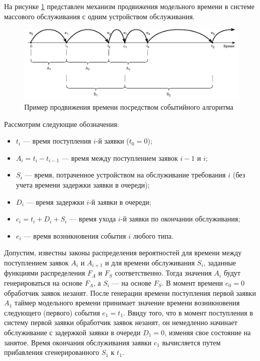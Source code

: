 На рисунке \ref{img:delta_z_example} представлен механизм продвижения модельного времени в системе массового обслуживания с одним устройством обслуживания.

\begin{figure}[h!btp]
	\centering
	\includegraphics[width=0.8\columnwidth]{inc/img/delta_z_example.pdf}
	\caption{Пример продвижения времени посредством событийного алгоритма}
	\label{img:delta_z_example}	
\end{figure}

Рассмотрим следующие обозначения:
\begin{itemize}
	\item $t_i$ --- время поступления $i$-й заявки ($t_0 = 0$);
	\item $A_i = t_i - t_{i-1}$ --- время между поступлением заявок $i-1$ и $i$; 
	\item $S_i$ --- время, потраченное устройством на обслуживание требования $i$ (без учета времени задержки заявки в очереди);
	\item $D_i$ --- время задержки $i$-й заявки в очереди;
	\item $c_i = t_i + D_i + S_i$ --- время ухода $i$-й заявки по окончании обслуживания;
	\item $e_i$ --- время возникновения события $i$ любого типа.
\end{itemize}

Допустим, известны законы распределения вероятностей для времени между поступлением заявок $A_i$ и $A_{i+1}$ и для времени обслуживания $S_i$, заданные функциями распределения $F_A$ и $F_S$ соответственно. Тогда значения $A_i$ будут генерироваться на основе $F_A$, а $S_i$ --- на основе $F_S$.
В момент времени $e_0 = 0$ обработчик заявок незанят. После генерации времени поступления первой заявки $A_1$ таймер модельного времени принимает значение времени возникновения следующего (первого) события $e_1 = t_1$. Ввиду того, что в момент поступления в систему первой заявки обработчик заявок незанят, он немедленно начинает обслуживание с задержкой заявки в очереди $D_1 = 0$, изменяя свое состояние на занятое. Время окончания обслуживания заявки $c_1$ вычисляется путем прибавления сгенерированного $S_1$ к $t_1$. 

